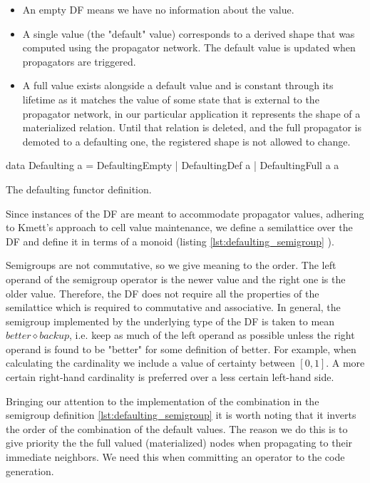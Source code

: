 \begin{itemize}
\item An empty DF means we have no information about the value.
\item A single value (the "default" value) corresponds to a derived
  shape that was computed using the propagator network. The default
  value is updated when propagators are triggered.
\item A full value exists alongside a default value and is constant
  through its lifetime as it matches the value of some state that is
  external to the propagator network, in our particular application it
  represents the shape of a materialized relation. Until that relation
  is deleted, and the full propagator is demoted to a defaulting one,
  the registered shape is not allowed to change.
\end{itemize}

\begin{code}
  \begin{haskellcode}
    data Defaulting a =
      DefaultingEmpty
      | DefaultingDef a
      | DefaultingFull a a
  \end{haskellcode}

  \caption{\label{lst:defaulting_functor}The defaulting functor definition.}
\end{code}

Since instances of the DF are meant to accommodate propagator values,
adhering to Kmett's approach to cell value maintenance, we define a
semilattice over the DF and define it in terms of a monoid (listing
\ref{lst:defaulting_semigroup} ).

Semigroups are not commutative, so we give meaning to the order. The
left operand of the semigroup operator is the newer value and the
right one is the older value. Therefore, the DF does not require all
the properties of the semilattice which is required to commutative and
associative. In general, the semigroup implemented by the underlying
type of the DF is taken to mean
\(\mathit{better} \diamond \mathit{backup}\), i.e. keep as much of the
left operand as possible unless the right operand is found to be
"better" for some definition of better. For example, when calculating
the cardinality we include a value of certainty between
\(\left[0,1\right]\).  A more certain right-hand cardinality is
preferred over a less certain left-hand side.

Bringing our attention to the implementation of the 
combination in the semigroup definition \ref{lst:defaulting_semigroup}
it is worth noting that it inverts the order of the combination of the
default values. The reason we do this is to give priority the the full
valued (materialized) nodes when propagating to their immediate
neighbors. We need this when committing an operator to the code
generation.

